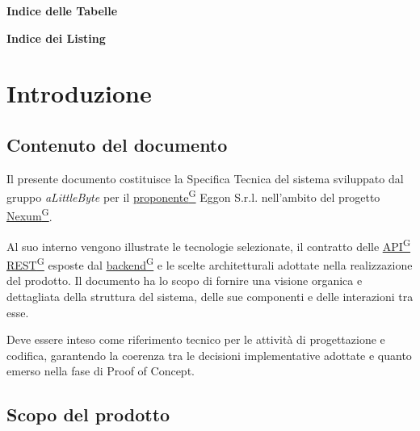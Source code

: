 \documentclass[a4paper,12pt]{article}
\providecommand{\glslink}[2]{\href{https://alittlebyte-19.github.io/Documentazione/glossario.html\#gls-#1}{\underline{#2}\textsuperscript{\scriptsize G}}}
\begin{document}
\begin{center}
    {\Large \textbf{Indice delle Tabelle}}
\end{center}

\vspace{0.6cm}

\makeatletter
{}
\makeatother

\newpage

\begin{center}
    {\Large \textbf{Indice dei Listing}}
\end{center}

\vspace{0.6cm}

\makeatletter
{}
\makeatother

\newpage
{}
\hypersetup{pageanchor=true}
\setcounter{page}{7}

\section{Introduzione}

\subsection{Contenuto del documento}

Il presente documento costituisce la Specifica Tecnica del sistema sviluppato dal gruppo \textit{aLittleByte} per il \glslink{committente-proponente}{proponente} Eggon S.r.l. nell'ambito del progetto \glslink{nexum}{Nexum}.

Al suo interno vengono illustrate le tecnologie selezionate, il contratto delle \glslink{api-application-programming-interface}{API} \glslink{rest-representational-state-transfer}{REST} esposte dal \glslink{backend}{backend} e le scelte architetturali adottate nella realizzazione del prodotto. Il documento ha lo scopo di fornire una visione organica e dettagliata della struttura del sistema, delle sue componenti e delle interazioni tra esse.

Deve essere inteso come riferimento tecnico per le attività di progettazione e codifica, garantendo la coerenza tra le decisioni implementative adottate e quanto emerso nella fase di Proof of Concept.

\subsection{Scopo del prodotto}
\end{document}

